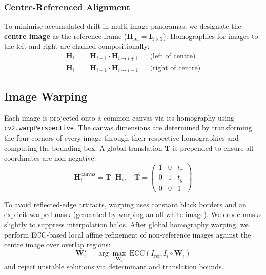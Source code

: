 \documentclass[conference]{IEEEtran}
\begin{document}
\subsubsection{Centre-Referenced Alignment}
To minimise accumulated drift in multi-image panoramas, we designate the
\textbf{centre image} as the reference frame ($\mathbf{H}_{\text{ref}} =
\mathbf{I}_{3\times3}$). Homographies for images to the left and right are
chained compositionally:
\begin{align}
  \mathbf{H}_i &= \mathbf{H}_{i+1} \cdot \mathbf{H}_{i \to i+1}
    && \text{(left of centre)} \\
  \mathbf{H}_i &= \mathbf{H}_{i-1} \cdot \mathbf{H}_{i \to i-1}
    && \text{(right of centre)}
\end{align}

\subsection{Image Warping}

Each image is projected onto a common canvas via its homography using
\texttt{cv2.warpPerspective}. The canvas dimensions are determined by
transforming the four corners of every image through their respective
homographies and computing the bounding box. A global translation
$\mathbf{T}$ is prepended to ensure all coordinates are non-negative:
\begin{equation}
  \mathbf{H}_i^{\text{canvas}} = \mathbf{T} \cdot \mathbf{H}_i, \quad
  \mathbf{T} = \begin{pmatrix} 1 & 0 & t_x \\ 0 & 1 & t_y \\ 0 & 0 & 1 \end{pmatrix}
\end{equation}

To avoid reflected-edge artifacts, warping uses constant black borders and an
explicit warped mask (generated by warping an all-white image). We erode masks
slightly to suppress interpolation halos. After global homography warping, we
perform ECC-based local affine refinement of non-reference images against the
centre image over overlap regions:
\begin{equation}
  \mathbf{W}_i^\star = \arg\max_{\mathbf{W}_i} \ \text{ECC}
  \left(I_{\text{ref}}, I_i \circ \mathbf{W}_i \right)
\end{equation}
and reject unstable solutions via determinant and translation bounds.
\end{document}
